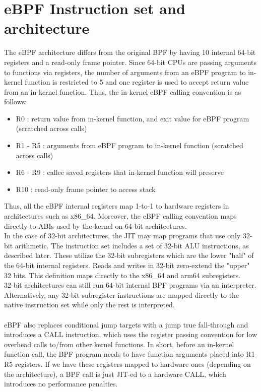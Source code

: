 \documentclass{l4proj}
\begin{document}
\section{eBPF Instruction set and architecture}
The eBPF architecture differs from the original BPF by having 10 internal 64-bit registers and a read-only frame pointer. Since 64-bit CPUs are passing arguments to functions via registers, the number of arguments from an eBPF program to in-kernel function is restricted to 5 and one register is used to accept return value from an in-kernel function. Thus, the in-kernel eBPF calling convention is as follows:
\begin{itemize}
    \item R0 : return value from in-kernel function, and exit value for eBPF program (scratched across calls)
    \item R1 - R5 : arguments from eBPF program to in-kernel function (scratched across calls)
    \item R6 - R9 : callee saved registers that in-kernel function will preserve
    \item R10 : read-only frame pointer to access stack
\end{itemize}
Thus, all the eBPF internal registers map 1-to-1 to hardware registers in architectures such as x86\_64. Moreover, the eBPF calling convention maps directly to ABIs used by the kernel on 64-bit architectures.\\
In the case of 32-bit architectures, the JIT may map programs that use only 32-bit arithmetic. The instruction set includes a set of 32-bit ALU instructions, as described later. These utilize the 32-bit subregisters which are the lower "half" of the 64-bit internal registers. Reads and writes in 32-bit zero-extend the "upper" 32 bits. This definition maps directly to the x86\_64 and arm64 subregisters.\\
32-bit architectures can still run 64-bit internal BPF programs via an interpreter. Alternatively, any 32-bit subregister instructions are mapped directly to the native instruction set while only the rest is interpreted.\\\\
eBPF also replaces conditional jump targets with a jump true fall-through and introduces a CALL instruction, which uses the register passing convention for low overhead calls to/from other kernel functions. In short, before an in-kernel function call, the BPF program needs to have function arguments placed into R1-R5 registers. If we have these registers mapped to hardware ones (depending on the architecture), a BPF call is just JIT-ed to a hardware CALL, which introduces no performance penalties.\\
\end{document}
